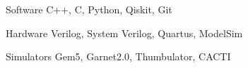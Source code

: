 

\begin{cvskills}

  \cvskill
    {Software} %
    {C++, C, Python, Qiskit, Git} %

  \cvskill
    {Hardware} %
    {Verilog, System Verilog, Quartus, ModelSim} %

  \cvskill
    {Simulators} %
    {Gem5, Garnet2.0, Thumbulator, CACTI} %
\end{cvskills}